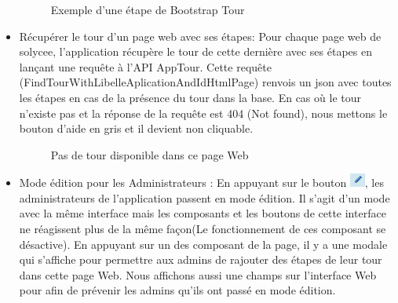 \documentclass[a4paper]{article}
\begin{document}
\begin{itemize}
\begin{figure}[H]
	\centering
  		\caption{Exemple d'une étape de Bootstrap Tour}
	\end{figure}

\item Récupérer le tour d'un page web avec ses étapes: Pour chaque page web de solycee, l'application récupère le tour de cette dernière avec ses étapes en lançant une requête à l'API AppTour. Cette requête (FindTourWithLibelleAplicationAndIdHtmlPage) renvois un json avec toutes les étapes en cas de la présence du tour dans la base. En cas où le tour n'existe pas et la réponse de la requête est 404 (Not found), nous mettons le bouton d'aide en gris et il devient non cliquable. 

\begin{figure}[H]
	\centering
  		\caption{Pas de tour disponible dans ce page Web }
	\end{figure}
    

\item Mode édition pour les Administrateurs : En appuyant sur le bouton  \includegraphics[width=5mm,scale=0.5]{diagrammes/Bouton_modeEdition.png}, les administrateurs  de l'application passent en mode édition. Il s'agit d'un mode avec la même interface mais les composants et les boutons de cette interface ne réagissent plus de la même façon(Le fonctionnement de ces composant se désactive). En appuyant sur un des composant de la page, il y a une modale qui s'affiche pour permettre aux admins de rajouter des étapes de leur tour dans cette page Web.  Nous affichons aussi une champs sur l'interface Web pour afin de prévenir les admins qu'ils ont passé en mode édition.


\end{itemize}
\end{document}
